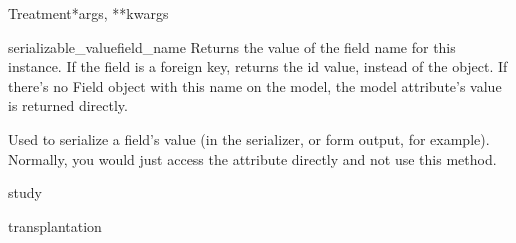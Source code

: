 \documentclass[letterpaper,10pt,english]{sphinxmanual}
\begin{document}
\begin{classdesc}{Treatment}{*args, **kwargs}
\hypertarget{data.models.Treatment.serializable_value}{}\begin{methoddesc}[Treatment]{serializable\_value}{field\_name}
Returns the value of the field name for this instance. If the field is
a foreign key, returns the id value, instead of the object. If there's
no Field object with this name on the model, the model attribute's
value is returned directly.

Used to serialize a field's value (in the serializer, or form output,
for example). Normally, you would just access the attribute directly
and not use this method.
\end{methoddesc}

\hypertarget{data.models.Treatment.study}{}\begin{memberdesc}[Treatment]{study}\end{memberdesc}

\hypertarget{data.models.Treatment.transplantation}{}\begin{memberdesc}[Treatment]{transplantation}\end{memberdesc}
\end{classdesc}
\end{document}
